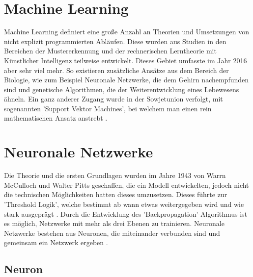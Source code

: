 \section{Machine Learning}
\label{sec:Machine Learning}

Machine Learning definiert eine große Anzahl an Theorien und Umsetzungen von nicht explizit programmierten Abläufen. 
Diese wurden aus Studien in den Bereichen der Mustererkennung und der rechnerischen Lerntheorie mit Künstlicher Intelligenz teilweise entwickelt. 
Dieses Gebiet umfasste im Jahr 2016 aber sehr viel mehr. 
So existieren zusätzliche Ansätze aus dem Bereich der Biologie, wie zum Beispiel Neuronale Netzwerke, die dem Gehirn nachempfunden sind und genetische Algorithmen, die der Weiterentwicklung eines Lebewesens ähneln. 
Ein ganz anderer Zugang wurde in der Sowjetunion verfolgt, mit sogenannten 'Support Vektor Machines', bei welchem man einen rein mathematischen Ansatz anstrebt \cite{lampropoulos2015machine}. 

\section{Neuronale Netzwerke}


Die Theorie und die ersten Grundlagen wurden im Jahre 1943 von Warrn McCulloch und Walter Pitts geschaffen, die ein Modell entwickelten, jedoch nicht die technischen Möglichkeiten hatten dieses umzusetzen.
Dieses %
führte zur 'Threshold Logik', welche bestimmt ab wann etwas weitergegeben wird und wie stark ausgeprägt \cite{rojas2013neural}. 
Durch die Entwicklung des 'Backpropagation'-Algorithmus ist es möglich, Netzwerke mit mehr als drei Ebenen zu trainieren.
Neuronale Netzwerke bestehen aus Neuronen, die miteinander verbunden sind und gemeinsam ein Netzwerk ergeben \cite{AI3}.  %



\subsection{Neuron}
\label{sec:Neuron}


